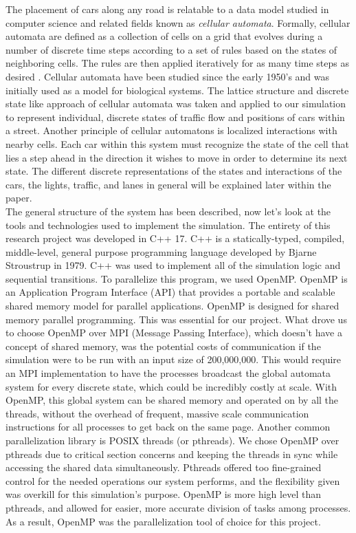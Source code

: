 \documentclass[conference]{IEEEtran}
\begin{document}
The placement of cars along any road is relatable to a data model studied in computer science and related fields known as \textit{cellular automata}. Formally, cellular automata are defined as a collection of cells on a grid that evolves during a number of discrete time steps according to a set of rules based on the states of neighboring cells. The rules are then applied iteratively for as many time steps as desired \cite{WolframCellularAutomaton}. Cellular automata have been studied since the early 1950’s and was initially used as a model for biological systems. The lattice structure and discrete state like approach of cellular automata was taken and applied to our simulation to represent individual, discrete states of traffic flow and positions of cars within a street.  Another principle of cellular automatons is localized interactions with nearby cells.  Each car within this system must recognize the state of the cell that lies a step ahead in the direction it wishes to move in order to determine its next state. The different discrete representations of the states and interactions of the cars, the lights, traffic, and lanes in general will be explained later within the paper. \\

The general structure of the system has been described, now let’s look at the tools and technologies used to implement the simulation. The entirety of this research project was developed in C++ 17.  C++ is a statically-typed, compiled, middle-level, general purpose programming language developed by Bjarne Stroustrup in 1979.  C++ was used to implement all of the simulation logic and sequential transitions.  To parallelize this program, we used OpenMP. OpenMP is an Application Program Interface (API) that provides a portable and scalable shared memory model for parallel applications. OpenMP is designed for shared memory parallel programming. This was essential for our project.  What drove us to choose OpenMP over MPI (Message Passing Interface), which doesn’t have a concept of shared memory, was the potential costs of communication if the simulation were to be run with an input size of 200,000,000.  This would require an MPI implementation to have the processes broadcast the global automata system for every discrete state, which could be incredibly costly at scale.  With OpenMP, this global system can be shared memory and operated on by all the threads, without the overhead of frequent, massive scale communication instructions for all processes to get back on the same page. Another common parallelization library is POSIX threads (or pthreads). We chose OpenMP over pthreads due to critical section concerns and keeping the threads in sync while accessing the shared data simultaneously.  Pthreads offered too fine-grained control for the needed operations our system performs, and the flexibility given was overkill for this simulation's purpose.  OpenMP is more high level than pthreads, and allowed for easier, more accurate division of tasks among processes. As a result, OpenMP was the parallelization tool of choice for this project. \cite{openmp} \\
\end{document}
